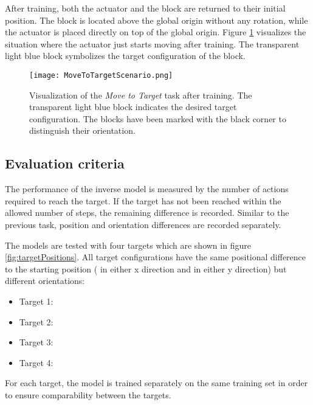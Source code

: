 After training, both the actuator and the block are returned to their initial position. The block is located  above the global origin without any rotation, while the actuator is placed directly on top of the global origin.
Figure \ref{fig:moveToTargetScenario} visualizes the situation where the actuator just starts moving after training. The transparent light blue block symbolizes the target configuration of the block.

\begin{figure}
\centering
\texttt{[image: MoveToTargetScenario.png]}
\caption{Visualization of the \textit{Move to Target} task after training. The transparent light blue block indicates the desired target configuration. The blocks have been marked with the black corner to distinguish their orientation.}
\label{fig:moveToTargetScenario}
\end{figure}

\subsection{Evaluation criteria}

The performance of the inverse model is measured by the number of actions required to reach the target. If the target has not been reached within the allowed number of steps, the remaining difference is recorded. Similar to the previous task, position and orientation differences are recorded separately.


The models are tested with four targets which are shown in figure  \ref{fig:targetPositions}. All target configurations have the same positional difference to the starting position ( in either x direction and  in either y direction) but different orientations: 
\begin{itemize}
\item Target 1: 
\item Target 2: 
\item Target 3:  
\item Target 4: 
\end{itemize}
For each target, the model is trained separately on the same training set in order to ensure comparability between the targets.

